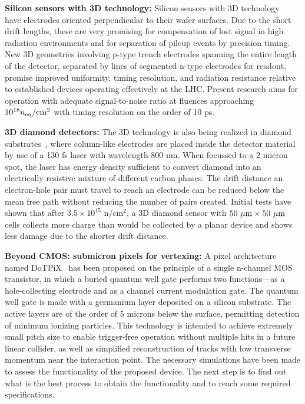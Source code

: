 {\bf Silicon sensors with 3D technology:}
Silicon sensors with 3D technology~\cite{Parker2019} have electrodes oriented perpendicular to their wafer surfaces.  Due to the short drift lengths, 
these are very promising for compensation of lost signal in high radiation environments and for separation of pileup events by precision timing. New 3D geometries involving p-type trench electrodes spanning the entire length of the detector, separated by lines of segmented n-type electrodes for readout, promise improved uniformity, timing resolution, and radiation resistance relative to established devices operating effectively at the LHC. Present research aims for operation with adequate signal-to-noise ratio at fluences approaching  $10^{18}n_{\rm eq}/{\rm cm}^2$ with timing resolution on the order of 10 ps.


{\bf 3D diamond detectors:}
The 3D technology is also being realized in diamond substrates~\cite{Tsung:2012gz}, where column-like electrodes are placed inside the detector material by use of a 130 fs laser with wavelength 800 nm. When focussed to a 2 micron spot, the laser has energy density sufficient to convert diamond into an electrically resistive mixture of different carbon phases. The drift distance an electron-hole pair must travel to reach an electrode can be reduced below the mean free path without reducing the number of pairs created. Initial tests have shown that after $3.5 \times 10^{15}$ n/cm$^2$, a 3D diamond sensor with $50~\mu{\rm m} \times 50~\mu{\rm m}$ cells collects more charge than would be collected by a planar device and shows less damage due to the shorter drift distance. 

{\bf Beyond CMOS: submicron pixels for vertexing:}
A pixel architecture named DoTPiX~\cite{Fourches2017} has been proposed on the principle of a single n-channel MOS transistor, in which a buried quantum well gate performs two functions---as a hole-collecting electrode and as a channel current modulation gate. The quantum well gate is made with a germanium layer deposited on a silicon substrate. The active layers are of the order of 5 microns below the surface, permitting detection of minimum ionizing particles. This technology is intended to achieve extremely small pitch size to enable trigger-free operation without multiple hits in a future linear collider, as well as simplified reconstruction of tracks with low transverse momentum near the interaction point. The necessary simulations have been made to assess the functionality of the proposed device. The next step is to find out what is the best process to obtain the functionality and to reach some required specifications.

